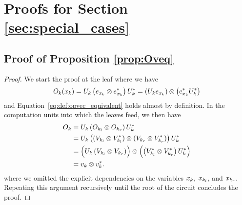 






\section{Proofs for Section \ref{sec:special_cases}}

\subsection{Proof of Proposition \ref{prop:Oveq}}
\label{sec:proof:prop:Oveq}


\propOveq*

\begin{proof}
	We start the proof at the leaf where we have
	\begin{align}
		O_k(x_k)
		=
		U_k \left( e_{x_k} \otimes e_{x_k}^*  \right) U_k^*
		=
		\left( U_k e_{x_k} \right) \otimes \left( e_{x_k}^* U_k^* \right)
	\end{align}
	and Equation~\ref{eq:def:opvec_equivalent} holds almost by definition. In the computation units into which the leaves feed, we then have
	\begin{align}
		O_k
		 & = U_k \left( O_{k_l} \otimes O_{k_r} \right) U_k^*
		\nonumber
		\\
		 & = U_k \left( (V_{k_l} \otimes V^*_{k_l}) \otimes (V_{k_r} \otimes V^*_{k_r} ) \right) U_k^*
		\nonumber
		\\
		 & = \Bigl( U_k \left( V_{k_l} \otimes V_{k_r} \right) \Bigr)
		\otimes
		\Bigl( \left( V^*_{k_l}  \otimes V^*_{k_r}  \right) U_k^* \Bigr)
		\nonumber
		\\
		 & = v_k \otimes v_k^*.
	\end{align}
	where we omitted the explicit dependencies on the variables $x_k$, $x_{k_l}$, and $x_{k_r}$.
	Repeating this argument recursively until the root of the circuit concludes the proof.
\end{proof}





